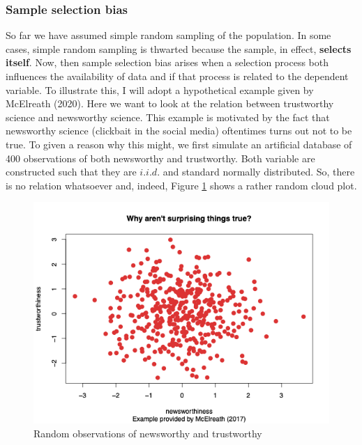 \documentclass[
]{book}
\begin{document}
\hypertarget{sample-selection-bias}{%
\subsubsection{Sample selection bias}\label{sample-selection-bias}}

So far we have assumed simple random sampling of the population. In some cases, simple random sampling is thwarted because the sample, in effect, \textbf{selects itself}. Now, then sample selection bias arises when a selection process both influences the availability of data and if that process is related to the dependent variable. To illustrate this, I will adopt a hypothetical example given by McElreath (2020). Here we want to look at the relation between trustworthy science and newsworthy science. This example is motivated by the fact that newsworthy science (clickbait in the social media) oftentimes turns out not to be true. To given a reason why this might, we first simulate an artificial database of 400 observations of both newsworthy and trustworthy. Both variable are constructed such that they are \(i.i.d.\) and standard normally distributed. So, there is no relation whatsoever and, indeed, Figure \ref{fig:Rplot} shows a rather random cloud plot.

\begin{figure}

{\centering \includegraphics[width=600px]{./figures/Rplot} 

}

\caption{Random observations of newsworthy and trustworthy}\label{fig:Rplot}
\end{figure}
\end{document}
